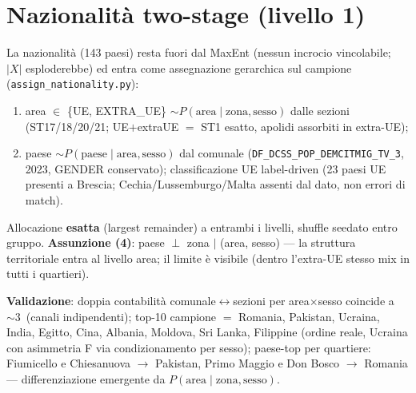 \documentclass[11pt,a4paper]{article}
\newcommand{\code}[1]{\texttt{#1}}
\newcommand{\flow}[1]{\texttt{\small #1}}
\begin{document}
\section{Nazionalit\`a two-stage (livello 1)}
\label{sec:naz}
La nazionalit\`a (143 paesi) resta fuori dal MaxEnt (nessun incrocio
vincolabile; $|X|$ esploderebbe) ed entra come assegnazione gerarchica sul
campione (\code{assign\_nationality.py}):
\begin{enumerate}[leftmargin=*,itemsep=1pt]
  \item[(2a)] area $\in$ \{UE, EXTRA\_UE\} $\sim P(\text{area}\mid
  \text{zona},\text{sesso})$ dalle sezioni (ST17/18/20/21; UE$+$extraUE
  $=$ ST1 esatto, apolidi assorbiti in extra-UE);
  \item[(2b)] paese $\sim P(\text{paese}\mid\text{area},\text{sesso})$ dal
  comunale (\flow{DF\_DCSS\_POP\_DEMCITMIG\_TV\_3}, 2023, GENDER
  conservato); classificazione UE label-driven (23 paesi UE presenti a
  Brescia; Cechia/Lussemburgo/Malta assenti dal dato, non errori di match).
\end{enumerate}
Allocazione \textbf{esatta} (largest remainder) a entrambi i livelli, shuffle
seedato entro gruppo. \textbf{Assunzione (4)}: paese $\perp$ zona $\mid$
(area, sesso) --- la struttura territoriale entra al livello area; il limite
\`e visibile (dentro l'extra-UE stesso mix in tutti i quartieri).

\medskip\noindent\textbf{Validazione}: doppia contabilit\`a
comunale$\leftrightarrow$sezioni per area$\times$sesso coincide a
$\sim3$\textperthousand\ (canali indipendenti); top-10 campione $=$
Romania, Pakistan, Ucraina, India, Egitto, Cina, Albania, Moldova, Sri
Lanka, Filippine (ordine reale, Ucraina con asimmetria F via
condizionamento per sesso); paese-top per quartiere: Fiumicello e
Chiesanuova $\to$ Pakistan, Primo Maggio e Don Bosco $\to$ Romania ---
differenziazione emergente da $P(\text{area}\mid\text{zona},\text{sesso})$.

\end{document}
